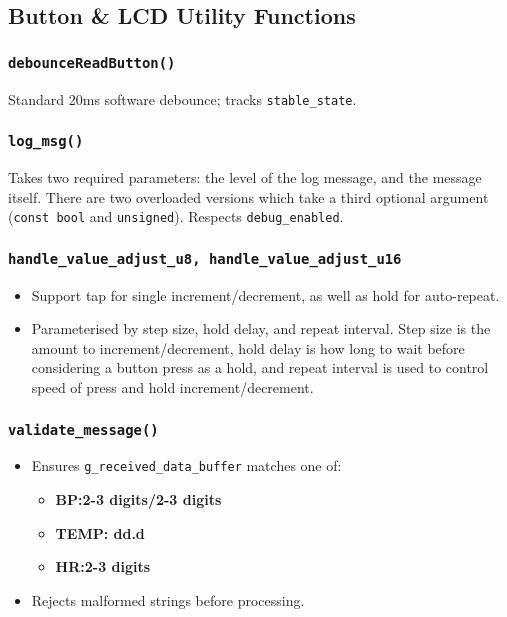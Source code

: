\subsection{Button \& LCD Utility Functions}
\subsubsection{\lstinline|debounceReadButton()|}
Standard 20ms software debounce; tracks \lstinline|stable_state|.
\subsubsection{\lstinline|log_msg()|}
Takes two required parameters: the level of the log message, and the message itself. There are two overloaded versions which take a third optional argument (\lstinline|const bool| and \lstinline|unsigned|). Respects \lstinline|debug_enabled|.
\subsubsection{\lstinline|handle_value_adjust_u8, handle_value_adjust_u16|}
\begin{itemize}
	\item Support tap for single increment/decrement, as well as hold for auto-repeat.
	\item Parameterised by step size, hold delay, and repeat interval. Step size is the amount to increment/decrement, hold delay is how long to wait before considering a button press as a hold, and repeat interval is used to control speed of press and hold increment/decrement.
	
\end{itemize}
\subsubsection{\lstinline|validate_message()|}
\begin{itemize}
	\item Ensures \lstinline|g_received_data_buffer| matches one of:
	\begin{itemize}
		\item \textbf{BP:2-3 digits/2-3 digits}
		\item \textbf{TEMP: dd.d}
		\item \textbf{HR:2-3 digits}
	\end{itemize}
	\item Rejects malformed strings before processing.
\end{itemize}

